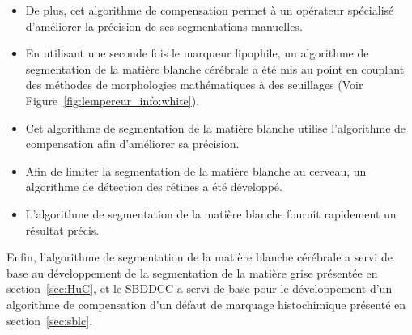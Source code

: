 \documentclass[\main/main.tex]{subfiles}
\begin{document}
\begin{itemize}
    \item
    De plus, cet algorithme de compensation permet à un opérateur spécialisé
    d'améliorer la précision de ses segmentations manuelles.
    
    \item
    En utilisant une seconde fois le marqueur lipophile, un algorithme de segmentation de la matière blanche cérébrale a été mis au point en couplant des méthodes de morphologies mathématiques à des seuillages (Voir Figure~\ref{fig:lempereur_info:white}).
    
    \item
    Cet algorithme de segmentation de la matière blanche utilise
    l'algorithme de compensation afin d'améliorer sa précision.
    
    \item
    Afin de limiter la segmentation de la matière blanche au cerveau,
    un algorithme de détection des rétines a été développé.
    
    \item
    L'algorithme de segmentation de la matière blanche fournit rapidement un résultat précis. 
    
\end{itemize}

%
Enfin, l'algorithme de segmentation de la matière blanche cérébrale a servi de base au
développement de la segmentation de la matière grise présentée en section~\ref{sec:HuC},
et le SBDDCC a servi de base pour le développement d'un algorithme de compensation
d'un défaut de marquage histochimique présenté en section~\ref{sec:sblc}.
\end{document}

